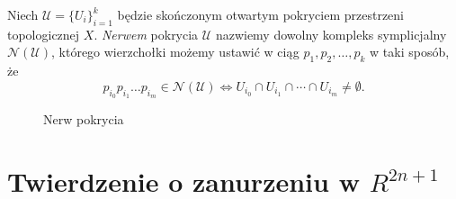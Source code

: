 \begin{defi}
    \cite{alex1927} 
    Niech $\mathcal{U} = \{U_i\}_{i=1}^k$ będzie skończonym otwartym pokryciem przestrzeni topologicznej $X$.
    \emph{Nerwem} pokrycia $\mathcal{U}$ nazwiemy dowolny kompleks symplicjalny $\mathcal{N(U)}$, 
    którego wierzchołki możemy ustawić w ciąg $p_1, p_2, \ldots, p_k$ w taki sposób, że
    \[p_{i_0}p_{i_1} \ldots p_{i_m}\in \mathcal{N(U)} \Longleftrightarrow U_{i_0}\cap U_{i_1}\cap \cdots \cap U_{i_m}\neq \emptyset. \]
    \begin{figure}[H]
        \centering
        
        \caption{Nerw pokrycia}
        \label{fig:nerw_2}
    \end{figure}
\end{defi}

\section{Twierdzenie o zanurzeniu w $R^{2n+1}$}

